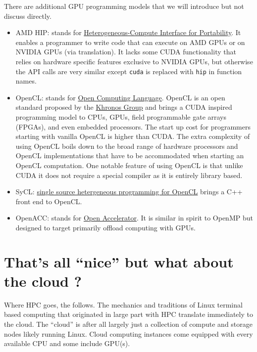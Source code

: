 There are additional GPU programming models that we will introduce but not discuss directly.

\begin{itemize}
    \item {AMD HIP}: stands for \href{https://gpuopen.com/compute-product/hip-convert-cuda-to-portable-c-code/}{Heterogeneous-Compute Interface for Portability}. It enables a programmer to write code that can execute on AMD GPUs or on NVIDIA GPUs (via translation). It lacks some CUDA functionality that relies on hardware specific features exclusive to NVIDIA GPUs, but otherwise the API calls are very similar except \texttt{cuda} is replaced with \texttt{hip} in function names.
    
    \item {OpenCL}: stands for \href{https://en.wikipedia.org/wiki/OpenCL}{Open Computing Language}. OpenCL is an open standard proposed by the \href{https://www.khronos.org/opencl/}{Khronos Group} and brings a CUDA inspired programming model to  CPUs, GPUs, field programmable gate arrays (FPGAs), and even embedded processors. The start up cost for programmers starting with vanilla OpenCL is higher than CUDA. The extra complexity of using OpenCL boils down to the broad range of hardware processors and OpenCL implementations that have to be accommodated when starting an OpenCL computation. One notable feature of using OpenCL is that unlike CUDA it does not require a special compiler as it is entirely library based.
    
    \item {SyCL}: \href{https://www.khronos.org/sycl/}{single source hetergeneous programming for OpenCL} brings a C++ front end to OpenCL.
    
    \item {OpenACC}: stands for \href{https://en.wikipedia.org/wiki/OpenACC}{Open Accelerator}. It is similar in spirit to OpenMP but designed to target primarily offload computing with GPUs. 
\end{itemize}

\section{That's all ``nice'' but what about the cloud ?}

Where HPC goes, the \faCloud{} follows. The mechanics and traditions of Linux terminal based computing that originated in large part with HPC translate immediately to the cloud. The ``cloud'' is after all largely just a collection of compute and storage nodes likely running Linux. Cloud computing instances come equipped with every available CPU and some include GPU(s). 

